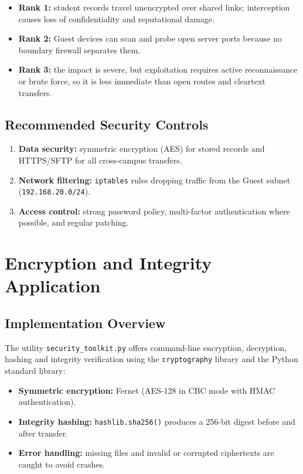 \documentclass[11pt,a4paper]{article}
\begin{document}
\begin{itemize}
  \item \textbf{Rank 1:} student records travel unencrypted over shared links;
        interception causes loss of confidentiality and reputational damage.
  \item \textbf{Rank 2:} Guest devices can scan and probe open server ports
        because no boundary firewall separates them.
  \item \textbf{Rank 3:} the impact is severe, but exploitation requires active
        reconnaissance or brute force, so it is less immediate than open
        routes and cleartext transfers.
\end{itemize}

\subsection{Recommended Security Controls}
\begin{enumerate}
  \item \textbf{Data security:} symmetric encryption (AES) for stored records
        and HTTPS/SFTP for all cross-campus transfers.
  \item \textbf{Network filtering:} \texttt{iptables} rules dropping traffic
        from the Guest subnet (\texttt{192.168.20.0/24}).
  \item \textbf{Access control:} strong password policy, multi-factor
        authentication where possible, and regular patching.
\end{enumerate}

\section{Encryption and Integrity Application}

\subsection{Implementation Overview}
The utility \texttt{security\_toolkit.py} offers command-line encryption,
decryption, hashing and integrity verification using the \texttt{cryptography}
library and the Python standard library:

\begin{itemize}
  \item \textbf{Symmetric encryption:} Fernet (AES-128 in CBC mode with HMAC authentication).
  \item \textbf{Integrity hashing:} \texttt{hashlib.sha256()} produces a 256-bit
        digest before and after transfer.
  \item \textbf{Error handling:} missing files and invalid or corrupted
        ciphertexts are caught to avoid crashes.
\end{itemize}
\end{document}
